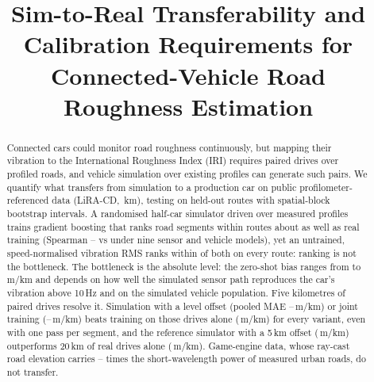 \documentclass[conference]{IEEEtran}
\begin{document}
\raggedbottom
\makeatletter{}\makeatother %

\title{Sim-to-Real Transferability and Calibration Requirements for Connected-Vehicle Road Roughness Estimation}

\author{
\and
{}
}

\maketitle

\begin{abstract}
Connected cars could monitor road roughness continuously, but mapping their vibration to the International Roughness Index (IRI) requires paired drives over profiled roads, and vehicle simulation over existing profiles can generate such pairs. We quantify what transfers from simulation to a production car on public profilometer-referenced data (LiRA-CD, \liraKm\,km), testing on held-out routes with spatial-block bootstrap intervals. A randomised half-car simulator driven over measured profiles trains gradient boosting that ranks road segments within routes about as well as real training (Spearman \vvRhoMin--\vvRhoMax{} vs \vrGbmRhoWithin{} under nine sensor and vehicle models), yet an untrained, speed-normalised vibration RMS ranks within \rpAbsMax{} of both on every route: ranking is not the bottleneck. The bottleneck is the absolute level: the zero-shot bias ranges from \vvBiasMin{} to \vvBiasMax\,m/km and depends on how well the simulated sensor path reproduces the car's vibration above 10\,Hz and on the simulated vehicle population. Five kilometres of paired drives resolve it. Simulation with a level offset (pooled MAE \pcCalMaeFiveMin--\pcCalMaeFiveMax\,m/km) or joint training (\poMaeFiveMin--\poMaeFiveMax\,m/km) beats training on those drives alone (\vbRealOnlyFive\,m/km) for every variant, even with one pass per segment, and the reference simulator with a 5\,km offset (\vvVzeroCalFive\,m/km) outperforms 20\,km of real drives alone (\vbRealOnlyTwenty\,m/km). Game-engine data, whose ray-cast road elevation carries \gePsdUrbanShortMin--\gePsdUrbanShortMax{} times the short-wavelength power of measured urban roads, do not transfer.
\end{abstract}
\end{document}
